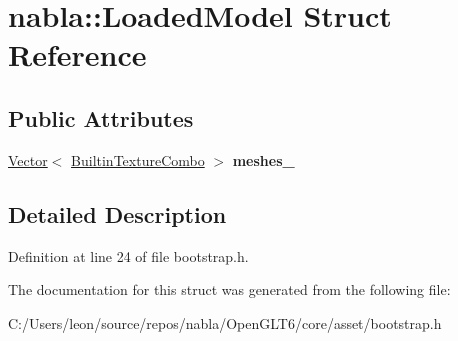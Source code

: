 \hypertarget{structnabla_1_1_loaded_model}{}\section{nabla\+::Loaded\+Model Struct Reference}
\label{structnabla_1_1_loaded_model}
\subsection*{Public Attributes}
\begin{DoxyCompactItemize}
\item 
\mbox{\label{structnabla_1_1_loaded_model_af5af2dd6701f197650593a13adbd4afe}} 
\mbox{\hyperlink{classnabla_1_1_s_t_l_vector_ex}{Vector}}$<$ \mbox{\hyperlink{structnabla_1_1_builtin_texture_combo}{Builtin\+Texture\+Combo}} $>$ {\bfseries meshes\+\_\+}
\end{DoxyCompactItemize}


\subsection{Detailed Description}


Definition at line 24 of file bootstrap.\+h.



The documentation for this struct was generated from the following file\+:\begin{DoxyCompactItemize}
\item 
C\+:/\+Users/leon/source/repos/nabla/\+Open\+G\+L\+T6/core/asset/bootstrap.\+h\end{DoxyCompactItemize}
